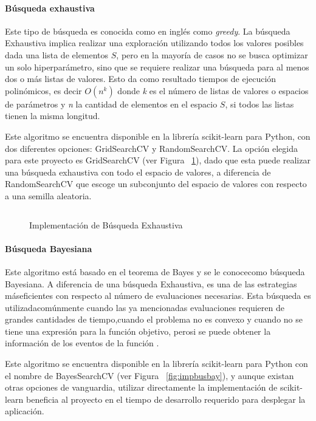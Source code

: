 \paragraph{Búsqueda exhaustiva} Este tipo de búsqueda es conocida como en inglés como \textit{greedy}. La búsqueda Exhaustiva implica realizar una exploración utilizando todos los valores posibles dada una lista de elementos $S$, pero en la mayoría de casos no se busca optimizar un solo hiperparámetro, sino que se requiere realizar una búsqueda para al menos dos o más listas de valores. Esto da como resultado tiempos de ejecución polinómicos, es decir $O(n^k)$ donde \textit{k} es el número de listas de valores o espacios de parámetros y \textit{n} la cantidad de elementos en el espacio $S$, si todos las listas tienen la misma longitud.

Este algoritmo se encuentra disponible en la librería scikit-learn \parencite{sklearn_api} para Python, con dos diferentes opciones: GridSearchCV y RandomSearchCV. La opción elegida para este proyecto es GridSearchCV (ver Figura ~\ref{fig:impbusexh}), dado que esta puede realizar una búsqueda exhaustiva con todo el espacio de valores, a diferencia de RandomSearchCV que escoge un subconjunto del espacio de valores con respecto a una semilla aleatoria.

\begin{figure}[H]
    \centering
    \caption{Implementación de Búsqueda Exhaustiva}
    \inputminted{Python}{pycode/gridsearch.py}
    \label{fig:impbusexh}
\end{figure}

\paragraph{Búsqueda Bayesiana} Este algoritmo está basado en el teorema de Bayes y se le conocecomo búsqueda Bayesiana. A diferencia de una búsqueda Exhaustiva, es una de las estrategias máseficientes con respecto al número de evaluaciones necesarias. Esta búsqueda es utilizadacomúnmente cuando las ya mencionadas evaluaciones requieren de grandes cantidades de tiempo,cuando el problema no es convexo y cuando no se tiene una expresión para la función objetivo, perosi se puede obtener la información de los eventos de la función \parencite{Brochu2010}.

Este algoritmo se encuentra disponible en la librería scikit-learn \parencite{sklearn_api} para Python con el nombre de BayesSearchCV (ver Figura ~\ref{fig:impbusbay}), y aunque existan otras opciones de vanguardia, utilizar directamente la implementación de scikit-learn beneficia al proyecto en el tiempo de desarrollo requerido para desplegar la aplicación.

